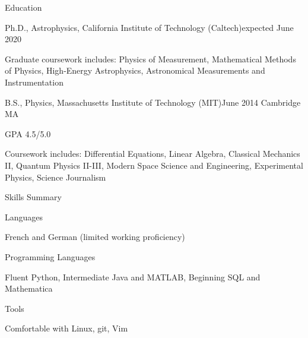 \documentclass{resume} %
\begin{document}

\begin{rSection}{Education}

\begin{rSubsection}
  {Ph.D., Astrophysics, California Institute of Technology (Caltech)}{expected June 2020}{}{}
\item Graduate coursework includes: 
  Physics of Measurement, Mathematical Methods of Physics,
  High-Energy Astrophysics, Astronomical Measurements and Instrumentation
\end{rSubsection}

\begin{rSubsection}
  {B.S., Physics, Massachusetts Institute of Technology (MIT)}{June 2014}
  {}{Cambridge MA}
\item GPA 4.5/5.0 
\item Coursework includes: Differential Equations, Linear Algebra,
  Classical Mechanics II, Quantum Physics II-III,
  Modern Space Science and Engineering, Experimental Physics,
  Science Journalism
\end{rSubsection}

\end{rSection}



\begin{rSection}{Skills Summary}
  \begin{rSubsection}{Languages}{}{}{}
    \item French and German (limited working proficiency)
  \end{rSubsection}

  \begin{rSubsection}{Programming Languages}{}{}{}
    \item Fluent Python, %
      Intermediate Java and MATLAB, Beginning SQL and Mathematica
  \end{rSubsection}

  \begin{rSubsection}{Tools}{}{}{}
    \item Comfortable with Linux, git, Vim
  \end{rSubsection}

\end{rSection}
\end{document}
